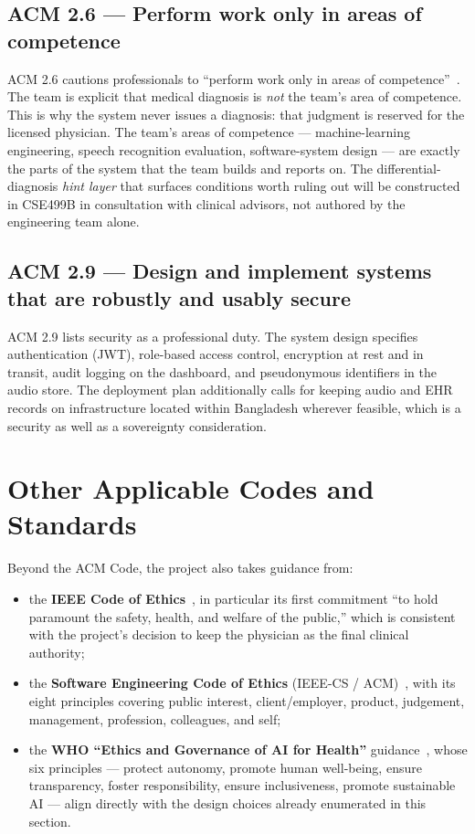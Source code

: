 \documentclass[12pt,a4paper]{article}
\begin{document}
\subsection{ACM 2.6 --- Perform work only in areas of competence}

ACM 2.6 cautions professionals to ``perform work only in areas of
competence''~\cite{eth:acm2018}. The team is explicit that medical
diagnosis is \emph{not} the team's area of competence. This is why
the system never issues a diagnosis: that judgment is reserved for
the licensed physician. The team's areas of competence ---
machine-learning engineering, speech recognition evaluation,
software-system design --- are exactly the parts of the system that
the team builds and reports on. The differential-diagnosis
\emph{hint layer} that surfaces conditions worth ruling out will be
constructed in CSE499B in consultation with clinical advisors, not
authored by the engineering team alone.

\subsection{ACM 2.9 --- Design and implement systems that are
robustly and usably secure}

ACM 2.9 lists security as a professional duty. The system design
specifies authentication (JWT), role-based access control,
encryption at rest and in transit, audit logging on the dashboard,
and pseudonymous identifiers in the audio store. The deployment
plan additionally calls for keeping audio and EHR records on
infrastructure located within Bangladesh wherever feasible, which is
a security as well as a sovereignty consideration.

\section{Other Applicable Codes and Standards}

Beyond the ACM Code, the project also takes guidance from:

\begin{itemize}[leftmargin=*]
\item the \textbf{IEEE Code of
Ethics}~\cite{eth:ieee}, in particular its first commitment ``to
hold paramount the safety, health, and welfare of the public,''
which is consistent with the project's decision to keep the
physician as the final clinical authority;
\item the \textbf{Software Engineering Code of Ethics}
(IEEE-CS / ACM)~\cite{eth:secode}, with its eight principles
covering public interest, client/employer, product, judgement,
management, profession, colleagues, and self;
\item the \textbf{WHO ``Ethics and Governance of AI for
Health''} guidance~\cite{eth:who}, whose six principles --- protect
autonomy, promote human well-being, ensure transparency,
foster responsibility, ensure inclusiveness, promote sustainable AI
--- align directly with the design choices already enumerated in
this section.
\end{itemize}
\end{document}

